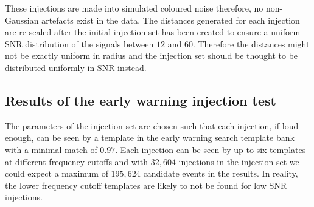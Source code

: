 %
These injections are made into simulated coloured noise therefore, no non-Gaussian artefacts exist in the data. The distances generated for each injection are re-scaled after the initial injection set has been created to ensure a uniform SNR distribution of the signals between $12$ and $60$. Therefore the distances might not be exactly uniform in radius and the injection set should be thought to be distributed uniformly in SNR instead.

\subsection{\label{6:sec:results}Results of the early warning injection test}


The parameters of the injection set are chosen such that each injection, if loud enough, can be seen by a template in the early warning search template bank with a minimal match of $0.97$. Each injection can be seen by up to six templates at different frequency cutoffs and with $32,604$ injections in the injection set we could expect a maximum of $195,624$ candidate events in the results. In reality, the lower frequency cutoff templates are likely to not be found for low SNR injections.

